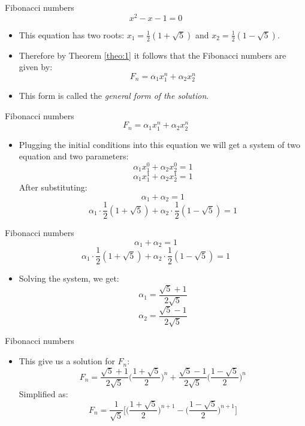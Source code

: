 \documentclass{beamer}
\begin{document}
\begin{frame}{Fibonacci numbers}
    $$ x^2 - x - 1 = 0 $$
    \begin{itemize}
     \item This equation has two roots: $x_1 = \frac{1}{2}(1 + \sqrt{5})$ and $x_2 = \frac{1}{2}(1 - \sqrt{5})$.
     \item Therefore by Theorem \ref{theo:1} it follows that the Fibonacci numbers are given by:
     $$ F_n = \alpha_1 x_1^n + \alpha_2 x_2^n $$
     \item This form is called the \textit{general form of the solution}.
    \end{itemize}
\end{frame}

\begin{frame}{Fibonacci numbers}
     $$ F_n = \alpha_1 x_1^n + \alpha_2 x_2^n $$
    \begin{itemize}
        \item Plugging the initial conditions into this equation we will get a system of two equation and two parameters:
        $$ \alpha_1 x_1^0 + \alpha_2 x_2^0 = 1 $$
        $$ \alpha_1 x_1^1 + \alpha_2 x_2^1 = 1 $$
        After substituting:
        $$ \alpha_1 + \alpha_2 = 1 $$
        $$ \alpha_1 \cdot \frac{1}{2}(1 + \sqrt{5}) + \alpha_2 \cdot \frac{1}{2}(1 - \sqrt{5}) = 1 $$
    \end{itemize}
\end{frame}

\begin{frame}{Fibonacci numbers}
        $$ \alpha_1 + \alpha_2 = 1 $$
        $$ \alpha_1 \cdot \frac{1}{2}(1 + \sqrt{5}) + \alpha_2 \cdot \frac{1}{2}(1 - \sqrt{5}) = 1 $$
    \begin{itemize}
        \item Solving the system, we get:
        $$ \alpha_1 = \frac{\sqrt{5} + 1}{2 \sqrt{5}} $$
        $$ \alpha_2 = \frac{\sqrt{5} - 1}{2 \sqrt{5}} $$
    \end{itemize}
\end{frame}

\begin{frame}{Fibonacci numbers}
    \begin{itemize}
        \item This give us a solution for $F_n$:
        $$ F_n = \frac{\sqrt{5} + 1}{2 \sqrt{5}} \Bigg(\frac{1 + \sqrt{5}}{2} \Bigg)^n + \frac{\sqrt{5} - 1}{2 \sqrt{5}} \Bigg(\frac{1 - \sqrt{5}}{2} \Bigg)^n $$
        Simplified as:
        $$ F_n = \frac{1}{\sqrt{5}} \Bigg[ \Bigg(\frac{1 + \sqrt{5}}{2} \Bigg)^{n+1} - \Bigg(\frac{1 - \sqrt{5}}{2} \Bigg)^{n+1} \Bigg] $$
    \end{itemize}
\end{frame}
\end{document}
